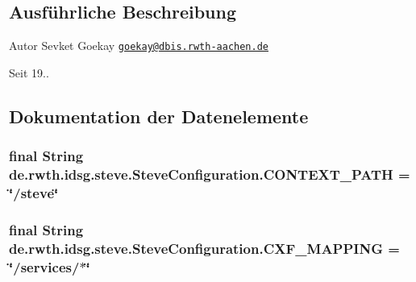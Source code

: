 \subsection{Ausführliche Beschreibung}
\begin{DoxyAuthor}{Autor}
Sevket Goekay \href{mailto:goekay@dbis.rwth-aachen.de}{\tt goekay@dbis.\-rwth-\/aachen.\-de} 
\end{DoxyAuthor}
\begin{DoxySince}{Seit}
19.. 
\end{DoxySince}


\subsection{Dokumentation der Datenelemente}
\hypertarget{classde_1_1rwth_1_1idsg_1_1steve_1_1_steve_configuration_a47f50a365d3a7d2b50e565b9add471e2}{
\subsubsection[{C\-O\-N\-T\-E\-X\-T\-\_\-\-P\-A\-T\-H}]{\setlength{\rightskip}{0pt plus 5cm}final String de.\-rwth.\-idsg.\-steve.\-Steve\-Configuration.\-C\-O\-N\-T\-E\-X\-T\-\_\-\-P\-A\-T\-H = \char`\"{}/steve\char`\"{}\hspace{0.3cm}{\ttfamily [static]}}}\label{classde_1_1rwth_1_1idsg_1_1steve_1_1_steve_configuration_a47f50a365d3a7d2b50e565b9add471e2}
\hypertarget{classde_1_1rwth_1_1idsg_1_1steve_1_1_steve_configuration_ae158db01245b410e0e718a7408f5c3e5}{
\subsubsection[{C\-X\-F\-\_\-\-M\-A\-P\-P\-I\-N\-G}]{\setlength{\rightskip}{0pt plus 5cm}final String de.\-rwth.\-idsg.\-steve.\-Steve\-Configuration.\-C\-X\-F\-\_\-\-M\-A\-P\-P\-I\-N\-G = \char`\"{}/services/$\ast$\char`\"{}\hspace{0.3cm}{\ttfamily [static]}}}\label{classde_1_1rwth_1_1idsg_1_1steve_1_1_steve_configuration_ae158db01245b410e0e718a7408f5c3e5}

